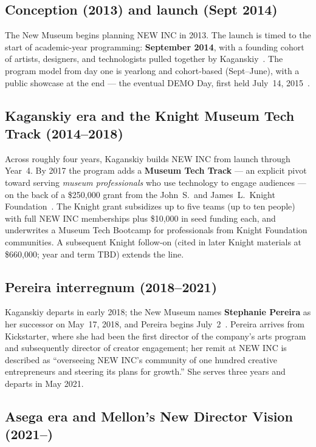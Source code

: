 \documentclass[10pt,letterpaper,twocolumn]{article}
\begin{document}
\subsection{Conception (2013) and launch (Sept 2014)}

The New Museum begins planning NEW INC in 2013. The launch is timed to the start of academic-year programming: \textbf{September 2014}, with a founding cohort of artists, designers, and technologists pulled together by Kaganskiy~\citep{fastcompany2014newinc}. The program model from day one is yearlong and cohort-based (Sept--June), with a public showcase at the end --- the eventual DEMO Day, first held July~14, 2015~\citep{broadwayworld2015demo}.

\subsection{Kaganskiy era and the Knight Museum Tech Track (2014--2018)}

Across roughly four years, Kaganskiy builds NEW INC from launch through Year~4. By 2017 the program adds a \textbf{Museum Tech Track} --- an explicit pivot toward serving \emph{museum professionals} who use technology to engage audiences --- on the back of a \$250,000 grant from the John~S.~and James~L.~Knight Foundation~\citep{knight2017newinc}. The Knight grant subsidizes up to five teams (up to ten people) with full NEW INC memberships plus \$10,000 in seed funding each, and underwrites a Museum Tech Bootcamp for professionals from Knight Foundation communities. A subsequent Knight follow-on (cited in later Knight materials at \$660,000; year and term TBD) extends the line.

\subsection{Pereira interregnum (2018--2021)}

Kaganskiy departs in early 2018; the New Museum names \textbf{Stephanie Pereira} as her successor on May~17, 2018, and Pereira begins July~2~\citep{artnews2018pereira}. Pereira arrives from Kickstarter, where she had been the first director of the company's arts program and subsequently director of creator engagement; her remit at NEW INC is described as ``overseeing NEW INC's community of one hundred creative entrepreneurs and steering its plans for growth.'' She serves three years and departs in May 2021.

\subsection{Asega era and Mellon's New Director Vision (2021--)}
\end{document}
